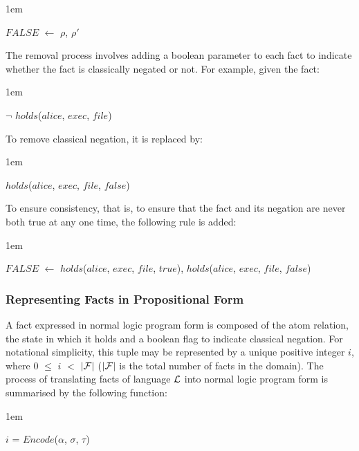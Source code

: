 \documentclass[11pt]{report}
\newenvironment{vquote}
{
  \begin{list}{}{\leftmargin 1em}\item[]
}
{
  \end{list}
}
\begin{document}
          \begin{vquote}
            $FALSE$ $\leftarrow$ $\rho$, $\rho'$
          \end{vquote}

          The removal process involves adding a boolean parameter to each fact
          to indicate whether the fact is classically negated or not. For
          example, given the fact:

          \begin{vquote}
            $\lnot$ $holds$($alice$, $exec$, $file$)
          \end{vquote}

          \noindent
          To remove classical negation, it is replaced by:

          \begin{vquote}
            $holds$($alice$, $exec$, $file$, $false$)
          \end{vquote}

          \noindent
          To ensure consistency, that is, to ensure that the fact and its
          negation are never both true at any one time, the following rule is
          added:

          \begin{vquote}
            $FALSE$ $\leftarrow$
            $holds$($alice$, $exec$, $file$, $true$),
            $holds$($alice$, $exec$, $file$, $false$)
          \end{vquote}

        \subsubsection{Representing Facts in Propositional Form}

          A fact expressed in normal logic program form is composed of the
          atom relation, the state in which it holds and a boolean flag to
          indicate classical negation. For notational simplicity, this tuple
          may be represented by a unique positive integer $i$, where
          $0$ $\leq$ $i$ $<$ $|{\cal F}|$ ($|{\cal F}|$ is the total
          number of facts in the domain). The process of translating facts of
          language ${\cal L}$ into normal logic program form is summarised by
          the following function:

          \begin{vquote}
            $i$ = $Encode$($\alpha$, $\sigma$, $\tau$)
          \end{vquote}
\end{document}
